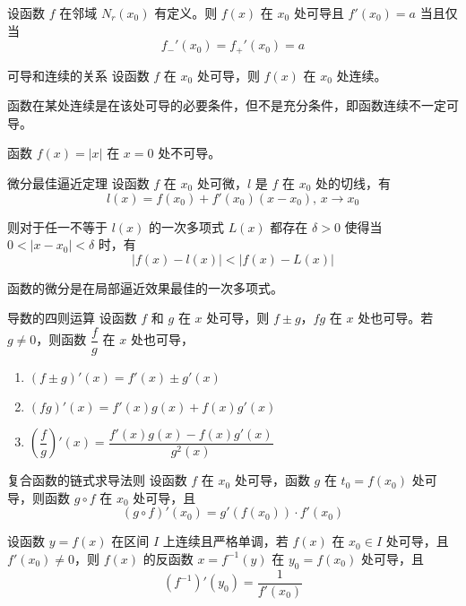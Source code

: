 \begin{proposition}
  设函数 $f$ 在邻域 $N_r(x_0)$ 有定义。则 $f(x)$ 在 $x_0$ 处可导且 $f'(x_0) = a$ 当且仅当
  \[f_{-}'(x_0) = f_{+}'(x_0) = a\]
\end{proposition}

\begin{theorem}{可导和连续的关系}
  设函数 $f$ 在 $x_0$ 处可导，则 $f(x)$ 在 $x_0$ 处连续。
\end{theorem}
\begin{remark}
  函数在某处连续是在该处可导的必要条件，但不是充分条件，即函数连续不一定可导。
\end{remark}

\hfill

\begin{example}
  函数 $f(x) = |x|$ 在 $x = 0$ 处不可导。
\end{example}

\hfill

\begin{theorem}{微分最佳逼近定理}
  设函数 $f$ 在 $x_0$ 处可微，$l$ 是 $f$ 在 $x_0$ 处的切线，有
  \[l(x) = f(x_0) + f'(x_0)(x - x_0),\, x\to x_0\]

  则对于任一不等于 $l(x)$ 的一次多项式 $L(x)$ 都存在 $\delta > 0$ 使得当 $0 < |x - x_0| < \delta$ 时，有
  \[|f(x) - l(x)| < |f(x) - L(x)|\]
\end{theorem}
函数的微分是在局部逼近效果最佳的一次多项式。

\begin{theorem}{导数的四则运算}
  设函数 $f$ 和 $g$ 在 $x$ 处可导，则 $f \pm g$，$fg$ 在 $x$ 处也可导。若 $g \ne 0$，则函数 $\dfrac{f}{g}$ 在 $x$ 处也可导，
  \begin{enumerate}
    \item $(f \pm g)'(x) = f'(x) \pm g'(x)$
    \item $(fg)'(x) = f'(x)g(x) + f(x)g'(x)$
    \item $\left(\dfrac{f}{g}\right)'(x) = \dfrac{f'(x)g(x) - f(x)g'(x)}{g^2(x)}$
  \end{enumerate}
\end{theorem}

\begin{theorem}{复合函数的链式求导法则}
  设函数 $f$ 在 $x_0$ 处可导，函数 $g$ 在 $t_0 = f(x_0)$ 处可导，则函数 $g \circ f$ 在 $x_0$ 处可导，且
  \[(g \circ f)'(x_0) = g'(f(x_0)) \cdot f'(x_0)\]
\end{theorem}

\begin{theorem}
  设函数 $y = f(x)$ 在区间 $I$ 上连续且严格单调，若 $f(x)$ 在 $x_0\in I$ 处可导，且 $f'(x_0) \ne 0$，则 $f(x)$ 的反函数 $x = f^{-1}(y)$ 在 $y_0 = f(x_0)$ 处可导，且
  \[\left(f^{-1}\right)'(y_0) = \dfrac{1}{f'(x_0)}\]
\end{theorem}

